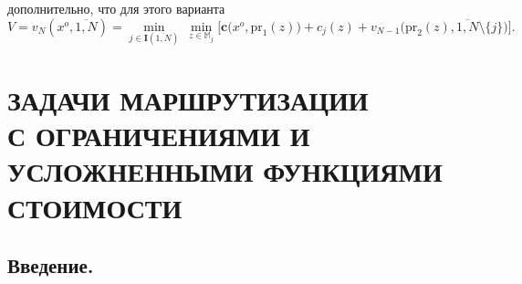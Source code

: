 \documentclass[11pt,twoside,openany]{report}
\newcommand{\ov}{\overline}
\newcommand{\sm}{\setminus}
\newcommand{\bbm}{{\mathbb M}}
\begin{document}
{дополнительно, что для этого варианта
$$V = v_N(x^o,\ov{1,N}) = \min\limits_{j\in \mathbf{I}(\ov{1,N})}\
\min\limits_{z\in \bbm_j}\bigl[\mathbf{c}(x^o,\mathrm{pr}_1(z)\bigl) +
c_j(z) + v_{N-1}\bigl(\mathrm{pr}_2(z),\ov{1,N}\sm\{j\}\bigl)\bigl].
$$






































\chapter{ЗАДАЧИ МАРШРУТИЗАЦИИ\\ С ОГРАНИЧЕНИЯМИ И УСЛОЖНЕННЫМИ
ФУНКЦИЯМИ СТОИМОСТИ }
\setcounter{chapter}{4}
\setcounter{equation}{0}



\section{Введение.}
\setcounter{equation}{0}

}
\end{document}
